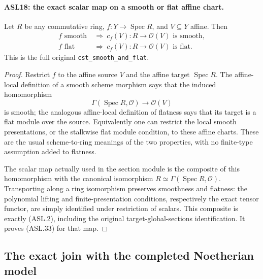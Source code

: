 \paragraph{ASL18: the exact scalar map on a smooth or flat affine chart.}
\label{claim:ASL18}
Let $R$ be any commutative ring, $f:Y\to\operatorname{Spec}R$,
and $V\subseteq Y$ affine.  Then
\[
 \begin{split}
 f\text{ smooth}&\ \Longrightarrow\ c_f(V):R\to\mathcal O(V)
                                    \text{ is smooth},\\
 f\text{ flat}&\ \Longrightarrow\ c_f(V):R\to\mathcal O(V)
                                    \text{ is flat}.
 \end{split}                                            \tag{ASL.33}
\]
This is the full original \texttt{cst\_\allowbreak{}smooth\_\allowbreak{}and\_\allowbreak{}flat}.

\begin{proof}
Restrict $f$ to the affine source $V$ and the affine target
$\operatorname{Spec}R$.  The affine-local definition of a
smooth scheme morphism says that the induced homomorphism
\[
 \Gamma(\operatorname{Spec}R,\mathcal O)
                              \longrightarrow\mathcal O(V)
\]
is smooth; the analogous affine-local definition of flatness
says that its target is a flat module over the source.
Equivalently one can restrict the local smooth presentations,
or the stalkwise flat module condition, to these affine charts.
These are the usual scheme-to-ring meanings of the two
properties, with no finite-type assumption added to flatness.

The scalar map actually used in the section module is the
composite of this homomorphism with the canonical isomorphism
$R\simeq\Gamma(\operatorname{Spec}R,\mathcal O)$.
Transporting along a ring isomorphism preserves smoothness
and flatness: the polynomial lifting and finite-presentation
conditions, respectively the exact tensor functor, are simply
identified under restriction of scalars.  This composite is
exactly (ASL.2), including the original target-global-sections
identification.  It proves (ASL.33) for that map.
\end{proof}

\subsection{The exact join with the completed Noetherian model}

